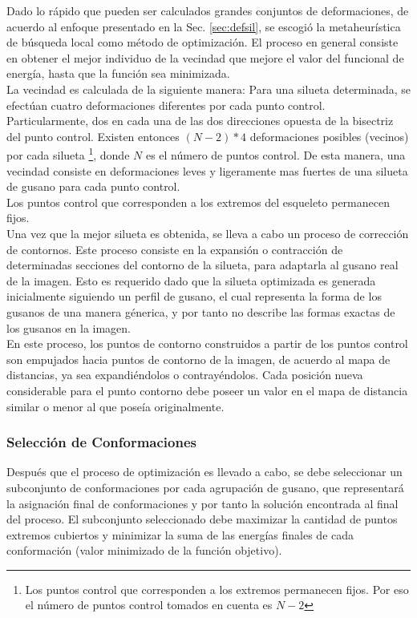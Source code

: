Dado lo r\'apido que pueden ser calculados grandes conjuntos de deformaciones,
de acuerdo al enfoque presentado en la Sec. \ref{sec:defsil}, se escogi\'o
la metaheur\'istica de b\'usqueda local como m\'etodo de optimizaci\'on.
El proceso en general consiste en obtener el mejor individuo de la vecindad
que mejore el valor del funcional de energ\'ia, hasta que la funci\'on sea
minimizada.\\
La vecindad es calculada de la siguiente manera:
Para una silueta determinada, se efect\'uan cuatro deformaciones diferentes por cada punto
control. Particularmente, dos en cada una de las dos direcciones opuesta de la bisectriz
del punto control. Existen entonces $(N-2)*4$  
deformaciones posibles (vecinos) por cada silueta \footnote{Los puntos control que corresponden 
a los extremos permanecen fijos. Por eso el n\'umero de puntos control tomados en cuenta es $N-2$}, 
donde $N$ es el n\'umero de puntos control. De esta manera, una vecindad consiste en deformaciones
leves y ligeramente mas fuertes de una silueta de gusano para cada punto control.\\ 
Los puntos control que corresponden a los extremos del esqueleto permanecen fijos.\\

Una vez que la mejor silueta es obtenida, se lleva a cabo un proceso de correcci\'on
de contornos. Este proceso consiste en la expansi\'on o contracci\'on de determinadas 
secciones del contorno de la silueta, para adaptarla al gusano real de la imagen.
Esto es requerido dado que la silueta optimizada es generada inicialmente siguiendo un 
perfil de gusano, el cual representa la forma de los gusanos de una manera g\'enerica, y
por tanto no describe las formas exactas de los gusanos en la imagen.\\
En este proceso, los puntos de contorno construidos a partir de los puntos control son
empujados hacia puntos de contorno de la imagen, de acuerdo al mapa de distancias, ya
sea expandi\'endolos o contray\'endolos. Cada posici\'on nueva considerable para el punto
contorno debe poseer un valor en el mapa de distancia similar o menor al que pose\'ia
originalmente.

\subsubsection*{Selecci\'on de Conformaciones}

Despu\'es que el proceso de optimizaci\'on es llevado a cabo, se debe seleccionar
un subconjunto de conformaciones por cada agrupaci\'on de gusano, que representar\'a
la asignaci\'on final de conformaciones y por tanto la soluci\'on encontrada al final
del proceso. El subconjunto seleccionado debe maximizar la cantidad
de puntos extremos cubiertos y minimizar la suma de las energ\'ias finales de
cada conformaci\'on (valor minimizado de la funci\'on objetivo).\\

